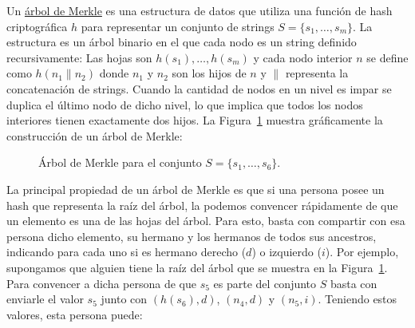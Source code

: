 
Un \href{https://en.wikipedia.org/wiki/Merkle_tree}{árbol de Merkle} es una estructura de datos que utiliza una función de hash criptográfica $h$ para representar un conjunto de strings $S=\{s_1,\ldots,s_m\}$. La estructura es un árbol binario en el que cada nodo es un string definido recursivamente: Las hojas son $h(s_1),\ldots,h(s_m)$ y cada nodo interior $n$ se define como $h(n_1 \| n_2)$ donde $n_1$ y $n_2$ son los hijos de $n$ y $\|$ representa la concatenación de strings. Cuando la cantidad de nodos en un nivel es impar se duplica el último nodo de dicho nivel, lo que implica que todos los nodos interiores tienen exactamente dos hijos. La Figura~\ref{fig:merkle} muestra gráficamente la construcción de un árbol de Merkle:

\begin{figure}[h]
  \scriptsize
  \begin{center}
  \end{center}
  \caption{Árbol de Merkle para el conjunto $S=\{s_1,\ldots,s_6\}$.}
  \label{fig:merkle}
\end{figure}

La principal propiedad de un árbol de Merkle es que si una persona posee un hash que representa la raíz del árbol, la podemos convencer rápidamente de que un elemento es una de las hojas del árbol. Para esto, basta con compartir con esa persona dicho elemento, su hermano y los hermanos de todos sus ancestros, indicando para cada uno si es hermano derecho ($d$) o izquierdo ($i$). Por ejemplo, supongamos que alguien tiene la raíz del árbol que se muestra en la Figura~\ref{fig:merkle}. Para convencer a dicha persona de que $s_5$ es parte del conjunto $S$ basta con enviarle el valor $s_5$ junto con $(h(s_6),d)$, $(n_4,d)$ y $(n_5,i)$. Teniendo estos valores, esta persona puede:

